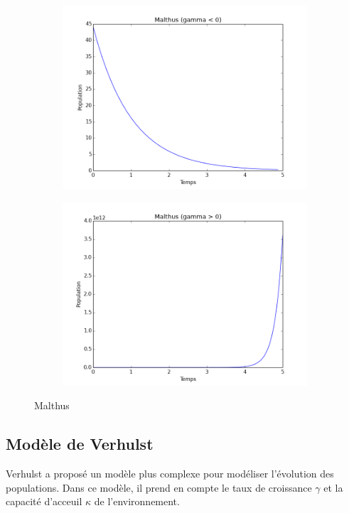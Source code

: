 \begin{figure}
\centering
\begin{subfigure}[b]{.3\textwidth}
\includegraphics[width=\textwidth]{mathusinf0}
\end{subfigure}
\begin{subfigure}[b]{.3\textwidth}
\includegraphics[width=\textwidth]{mathussup0}
\end{subfigure}

\caption{Malthus}
\label{fig:malthus}
\end{figure}

\subsection{Modèle de Verhulst}
Verhulst a proposé un modèle plus complexe pour modéliser l'évolution des populations. Dans ce modèle, il prend en compte le taux de croissance $\gamma$ et la capacité d'acceuil $\kappa$ de l'environnement.

